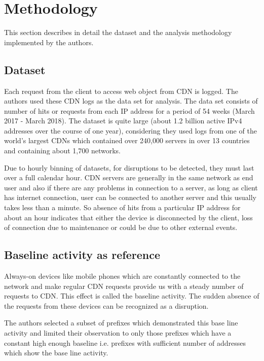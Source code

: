 \documentclass[11pt,twoside,a4paper]{article}
\begin{document}
\section{Methodology}  \label{M}
This section describes in detail the dataset and the analysis methodology implemented by the authors.

\subsection{Dataset}
Each request from the client to access web object from CDN is logged. The authors used these CDN logs as the data set for analysis. The data set consists of number of hits or requests from each IP address for a period of 54 weeks (March 2017 - March 2018). The dataset is quite large (about 1.2 billion active IPv4 addresses over the course of one year),  considering they used logs from one of the world's largest CDNs which contained over 240,000 servers in over 13 countries and containing about 1,700 networks.

Due to hourly binning of datasets, for disruptions to be detected, they must last over a full calendar hour. CDN servers are generally in the same network as end user and also if there are any problems in connection to a server, as long as client has internet connection, user can be connected to another server and this usually takes less than a minute. So absence of hits from a particular IP address for about an hour indicates that either the device is disconnected by the client, loss of connection due to maintenance or could be due to other external events. 

\subsection{Baseline activity as reference}
Always-on devices like mobile phones which are constantly connected to the network and make regular CDN requests provide us with a steady number of requests to CDN. This effect is called the baseline activity. The sudden absence of the requests from these devices can be recognized as a disruption. 

The authors selected a subset of prefixes which demonstrated this base line activity and limited their observation to only those prefixes which have a constant high enough baseline i.e. prefixes with sufficient number of addresses which show the base line activity. 
\end{document}
